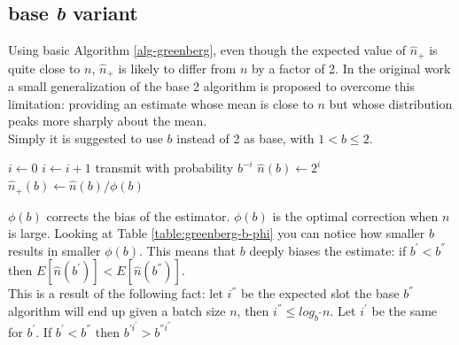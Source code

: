\documentclass[12pt,a4paper]{report}
\newcommand{\algname}[1]{\ensuremath{\mbox{\sc #1}}}
\begin{document}
\subsection{base \emph{b} variant}

Using basic Algorithm \ref{alg-greenberg}, even though the expected value of $\hat{n}_{+}$ is quite close to $n$, $\hat{n}_{+}$ is likely to differ from $n$ by a factor of 2. In the original work a small generalization of the base 2 algorithm is proposed to overcome this limitation: providing an estimate whose mean is  close to $n$ but whose  distribution peaks more sharply about the mean.\\
Simply it is suggested to use $b$ instead of 2 as base, with $1<b\leq2$.\\
\begin{algorithm}[H]
\begin{algorithmic}
\STATE $i\gets 0$
\REPEAT
	\STATE $i\gets i+1$
	\STATE transmit with probability $b^{-i}$
\STATE $\hat{n}(b) \gets 2^{i}$
\STATE $\hat{n}_{+}(b) \gets \hat{n}(b)/\phi(b)$
\end{algorithmic}
\caption{\algname{base \emph{b} Greenberg ($\mathcal{B}$)}}
\label{alg-greenberg-base-b}
\end{algorithm}

$\phi(b)$ corrects the bias of the estimator. $\phi(b)$ is the optimal correction when $n$ is large.
Looking at Table \ref{table:greenberg-b-phi} you can notice how smaller $b$ results in smaller $\phi(b)$. This means that $b$ deeply biases the estimate: if $b^{'} < b^{''}$ then $E[\hat{n}(b^{'})] < E[\hat{n}(b^{''})]$.\\ This is a result of the following fact: let $i^{''}$ be the expected slot the base $b^{''}$ algorithm will end up given a batch size $n$, then $i^{''} \leq log_{b^{''}} n$. Let $i^{'}$ be the same for $b^{'}$. If $b^{'} < b^{''}$ then $b^{'i^{'}} > b^{''i^{''}}$ 

\end{document}
